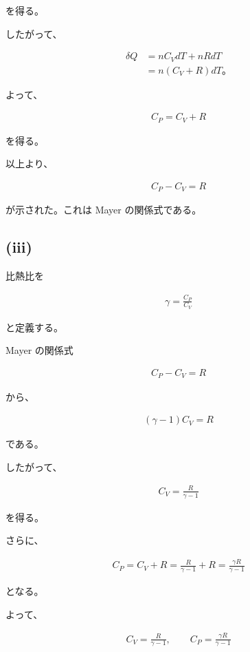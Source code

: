 \documentclass[platex,dvipdfmx,a4paper]{jsarticle}
\begin{document}
を得る。

したがって、

\begin{align*}
\delta Q
&=
nC_VdT+nRdT \\
&=
n(C_V+R)dT。
\end{align*}

よって、

\begin{align*}
C_P
=
C_V+R
\end{align*}

を得る。

以上より、

\begin{align*}
C_P-C_V=R
\end{align*}

が示された。これは Mayer の関係式である。

\subsection{(iii)}

比熱比を

\begin{align*}
\gamma
=
\frac{C_P}{C_V}
\end{align*}

と定義する。

Mayer の関係式

\begin{align*}
C_P-C_V=R
\end{align*}

から、

\begin{align*}
(\gamma-1)C_V
=
R
\end{align*}

である。

したがって、

\begin{align*}
C_V
=
\frac{R}{\gamma-1}
\end{align*}

を得る。

さらに、

\begin{align*}
C_P
=
C_V+R
=
\frac{R}{\gamma-1}+R
=
\frac{\gamma R}{\gamma-1}
\end{align*}

となる。

よって、

\begin{align*}
C_V
=
\frac{R}{\gamma-1},
\qquad
C_P
=
\frac{\gamma R}{\gamma-1}
\end{align*}
\end{document}
